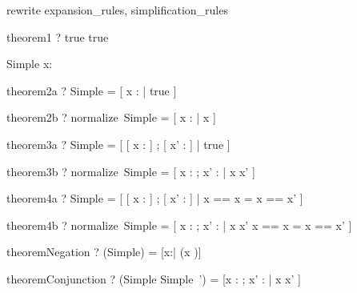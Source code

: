 \begin{zsection}
\SECTION rewrite \parents expansion\_rules, simplification\_rules
\end{zsection}

\begin{theorem}{theorem1}
  \vdash? true \iff true
\end{theorem}




\begin{schema}{Simple}
  x: \nat
\end{schema}

\begin{theorem}{theorem2a}
  \vdash? Simple = [ x : \nat | true ]
\end{theorem}

\begin{theorem}{theorem2b}
  \vdash? normalize~Simple = [ x : \arithmos | x \in \nat ]
\end{theorem}

\begin{theorem}{theorem3a}
  \vdash? \Delta Simple = [ [ x : \nat ] ; [ x' : \nat ] | true ]
\end{theorem}

\begin{theorem}{theorem3b}
  \vdash? normalize~\Delta Simple = [ x : \arithmos ; x' : \arithmos | x \in \nat \land x' \in \nat  ]
\end{theorem}

\begin{theorem}{theorem4a}
  \vdash? \Xi Simple =
	    [ [ x : \nat ] ; [ x' : \nat ] | \lblot x == x \rblot = \lblot x == x' \rblot ] 
\end{theorem}

\begin{theorem}{theorem4b}
  \vdash? normalize~\Xi Simple =
	    [ x : \arithmos ; x' : \arithmos | x \in \nat \land x' \in \nat  \land
			                                                 \lblot x == x \rblot = \lblot x == x' \rblot  ]
\end{theorem}

\begin{theorem}{theoremNegation}
  \vdash? (\lnot Simple) = [x:\arithmos | \lnot (x \in \nat)]
\end{theorem}

\begin{theorem}{theoremConjunction}
  \vdash? (Simple \land Simple~') = [x : \arithmos; x' : \arithmos | x \in \nat \land x' \in \nat]
\end{theorem}

